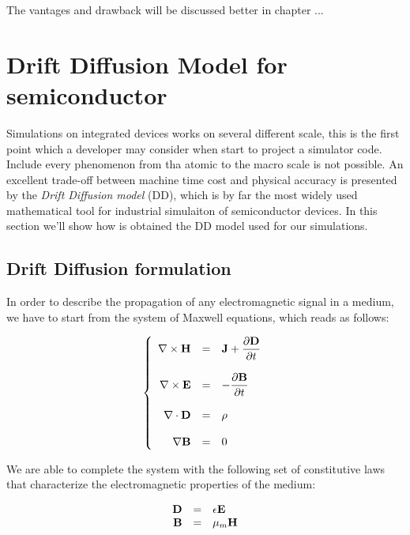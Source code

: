 The vantages and drawback will be discussed better in chapter ...


\section{Drift Diffusion Model for semiconductor}

Simulations on integrated devices works on several different scale, this is the first point which a developer may consider when start to project a simulator code. Include every phenomenon from tha atomic to the macro scale is not possible. An excellent  trade-off between machine time cost and physical accuracy is presented by the \textit{Drift Diffusion model} (DD), which is by far the most widely used mathematical tool for industrial simulaiton of semiconductor devices. In this section we'll show how is obtained the DD model used for our simulations.

\subsection{Drift Diffusion formulation}
 In order to describe the propagation of any electromagnetic signal in a medium, we have to start from the system of Maxwell equations, which reads as follows:

\begin{equation}
\label{eq: Maxwell system}
\left\{
\begin{array}{rcl}
\nabla \times \mathbf{H} & = & \mathbf{J} + \dfrac{\partial \mathbf{D}}{\partial t} \\ \\
\nabla \times \mathbf{E} & = & - \dfrac{\partial \mathbf{B}}{\partial t} \\ \\
\nabla \cdot \mathbf{D} & = & \rho \\ \\
\nabla \mathbf{B} &  = & 0
\end{array}
\right.
\end{equation}

We are able to complete the system with the following set of constitutive laws that characterize the electromagnetic properties of the medium:

\begin{equation}
\begin{array}{rcl}
\mathbf{D} & = & \epsilon \mathbf{E} \\
\mathbf{B} & = & \mu_m \mathbf{H}
\end{array}
\end{equation}

